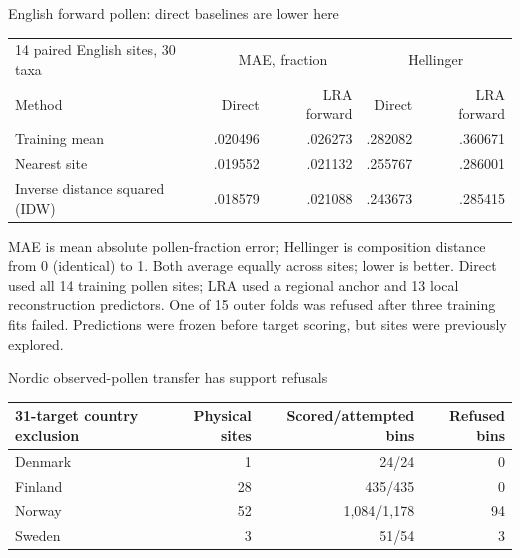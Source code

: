 \begin{frame}{English forward pollen: direct baselines are lower here}
\scriptsize
\begin{tabular}{lrrrr}
\toprule
14 paired English sites, 30 taxa & \multicolumn{2}{c}{MAE, fraction} & \multicolumn{2}{c}{Hellinger} \\
Method & Direct & LRA forward & Direct & LRA forward \\
\midrule
Training mean & .020496 & .026273 & .282082 & .360671 \\
Nearest site & .019552 & .021132 & .255767 & .286001 \\
Inverse distance squared (IDW) & .018579 & .021088 & .243673 & .285415 \\
\bottomrule
\end{tabular}
\par\smallskip
\small MAE is mean absolute pollen-fraction error; Hellinger is composition distance from 0 (identical) to 1. Both average equally across sites; lower is better. Direct used all 14 training pollen sites; LRA used a regional anchor and 13 local reconstruction predictors. One of 15 outer folds was refused after three training fits failed. Predictions were frozen before target scoring, but sites were previously explored.
\end{frame}

\begin{frame}{Nordic observed-pollen transfer has support refusals}
\small
\begin{tabular}{lrrr}
\toprule
31-target country exclusion & Physical sites & Scored/attempted bins & Refused bins \\
\midrule
Denmark & 1 & 24/24 & 0 \\
Finland & 28 & 435/435 & 0 \\
Norway & 52 & 1,084/1,178 & 94 \\
Sweden & 3 & 51/54 & 3 \\
\bottomrule
\end{tabular}
\end{frame}

